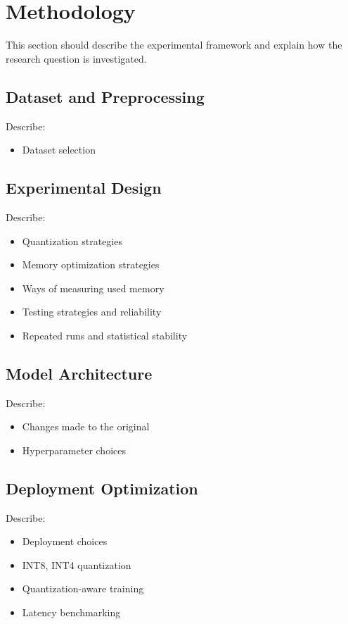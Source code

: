 \section{Methodology}

This section should describe the experimental framework and explain how the research question is investigated.

\subsection{Dataset and Preprocessing}

Describe:
\begin{itemize}
  \item Dataset selection
\end{itemize}

\subsection{Experimental Design}

Describe:
\begin{itemize}
  \item Quantization strategies
  \item Memory optimization strategies
  \item Ways of measuring used memory
  \item Testing strategies and reliability
  \item Repeated runs and statistical stability
\end{itemize}

\subsection{Model Architecture}

Describe:
\begin{itemize}
  \item Changes made to the original
  \item Hyperparameter choices
\end{itemize}

\subsection{Deployment Optimization}

Describe:
\begin{itemize}
  \item Deployment choices
  \item INT8, INT4 quantization
  \item Quantization-aware training
  \item Latency benchmarking
\end{itemize}

